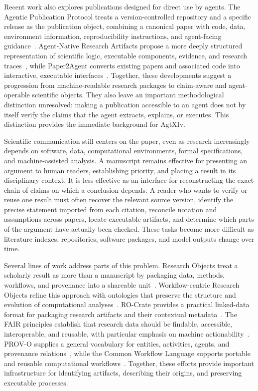 Recent work also explores publications designed for direct use by agents. The Agentic Publication Protocol treats a version-controlled repository and a specific release as the publication object, combining a canonical paper with code, data, environment information, reproducibility instructions, and agent-facing guidance~\cite{lu2026app}. Agent-Native Research Artifacts propose a more deeply structured representation of scientific logic, executable components, evidence, and research traces~\cite{liu2026ara}, while Paper2Agent converts existing papers and associated code into interactive, executable interfaces~\cite{miao2025paper2agent}. Together, these developments suggest a progression from machine-readable research packages to claim-aware and agent-operable scientific objects. They also leave an important methodological distinction unresolved: making a publication accessible to an agent does not by itself verify the claims that the agent extracts, explains, or executes. This distinction provides the immediate background for AgtXIv.

\iffalse
Scientific communication still centers on the paper, even as research increasingly depends on software, data, computational environments, formal specifications, and machine-assisted analysis. A manuscript remains effective for presenting an argument to human readers, establishing priority, and placing a result in its disciplinary context. It is less effective as an interface for reconstructing the exact chain of claims on which a conclusion depends. A reader who wants to verify or reuse one result must often recover the relevant source version, identify the precise statement imported from each citation, reconcile notation and assumptions across papers, locate executable artifacts, and determine which parts of the argument have actually been checked. These tasks become more difficult as literature indexes, repositories, software packages, and model outputs change over time.

Several lines of work address parts of this problem. Research Objects treat a scholarly result as more than a manuscript by packaging data, methods, workflows, and provenance into a shareable unit~\cite{bechhofer2013linked}. Workflow-centric Research Objects refine this approach with ontologies that preserve the structure and evolution of computational analyses~\cite{belhajjame2015ontologies}. RO-Crate provides a practical linked-data format for packaging research artifacts and their contextual metadata~\cite{soilandreyes2022rocrate,rocrate2024spec}. The FAIR principles establish that research data should be findable, accessible, interoperable, and reusable, with particular emphasis on machine actionability~\cite{wilkinson2016fair}. PROV-O supplies a general vocabulary for entities, activities, agents, and provenance relations~\cite{w3c2013provo}, while the Common Workflow Language supports portable and reusable computational workflows~\cite{crusoe2022cwl}. Together, these efforts provide important infrastructure for identifying artifacts, describing their origins, and preserving executable processes.


